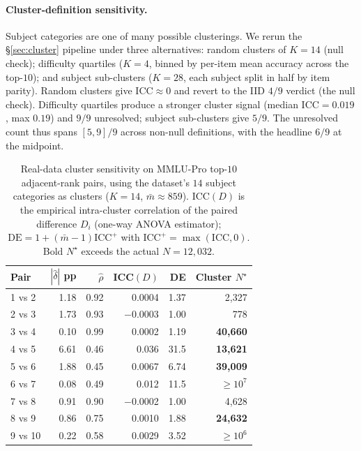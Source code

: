 \documentclass{article}
\theoremstyle{plain}
\theoremstyle{definition}
\begin{document}
\paragraph{Cluster-definition sensitivity.} Subject categories are one of many possible clusterings. We rerun the \S\ref{sec:cluster} pipeline under three alternatives: random clusters of $K{=}14$ (null check); difficulty quartiles ($K{=}4$, binned by per-item mean accuracy across the top-$10$); and subject sub-clusters ($K{=}28$, each subject split in half by item parity). Random clusters give $\mathrm{ICC}{\approx}0$ and revert to the IID $4/9$ verdict (the null check). Difficulty quartiles produce a stronger cluster signal (median $\mathrm{ICC}{=}0.019$, max $0.19$) and $9/9$ unresolved; subject sub-clusters give $5/9$. The unresolved count thus spans $[5, 9]/9$ across non-null definitions, with the headline $6/9$ at the midpoint.

\begin{table}[t]
\caption{Real-data cluster sensitivity on MMLU-Pro top-$10$ adjacent-rank pairs, using the dataset's $14$ subject categories as clusters ($K=14$, $\bar m\approx 859$). $\mathrm{ICC}(D)$ is the empirical intra-cluster correlation of the paired difference $D_i$ (one-way ANOVA estimator); $\mathrm{DE}=1+(\bar m-1)\mathrm{ICC}^+$ with $\mathrm{ICC}^+ = \max(\mathrm{ICC}, 0)$. Bold $N^{\star}$ exceeds the actual $N{=}12{,}032$.}
\label{tab:cluster}
\centering\footnotesize
\setlength{\tabcolsep}{4pt}
\begin{tabular}{lrrrrr}
\toprule
Pair & $|\hat\delta|$ pp & $\hat\rho$ & ICC$(D)$ & DE & Cluster $N^{\star}$ \\
\midrule
1 vs 2 & 1.18 & 0.92 & 0.0004 & 1.37  & 2{,}327 \\
2 vs 3 & 1.73 & 0.93 & $-$0.0003 & 1.00 & 778 \\
3 vs 4 & 0.10 & 0.99 & 0.0002 & 1.19  & \textbf{40{,}660} \\
4 vs 5 & 6.61 & 0.46 & 0.036  & 31.5  & \textbf{13{,}621} \\
5 vs 6 & 1.88 & 0.45 & 0.0067 & 6.74  & \textbf{39{,}009} \\
6 vs 7 & 0.08 & 0.49 & 0.012  & 11.5  & \textbf{$\geq\!10^{7}$} \\
7 vs 8 & 0.91 & 0.90 & $-$0.0002 & 1.00 & 4{,}628 \\
8 vs 9 & 0.86 & 0.75 & 0.0010 & 1.88  & \textbf{24{,}632} \\
9 vs 10 & 0.22 & 0.58 & 0.0029 & 3.52  & \textbf{$\geq\!10^{6}$} \\
\bottomrule
\end{tabular}
\end{table}
\end{document}
